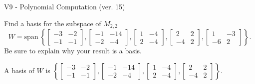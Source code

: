 \begin{exercise}
  \begin{exerciseTitle}V9 - Polynomial Computation (ver. 15)\end{exerciseTitle}
  \begin{exerciseStatement}
    Find a basis for the subspace of \(M_{2,2}\) 
\[W=\mathrm{span}\ \left\{\left[\begin{array}{cc}
-3 & -2 \\
-1 & -1
\end{array}\right] , \left[\begin{array}{cc}
-1 & -14 \\
-2 & -4
\end{array}\right] , \left[\begin{array}{cc}
1 & -4 \\
2 & -4
\end{array}\right] , \left[\begin{array}{cc}
2 & 2 \\
-4 & 2
\end{array}\right] , \left[\begin{array}{cc}
1 & -3 \\
-6 & 2
\end{array}\right]\right\}.\]
 Be sure to explain why your result is a basis.


  \end{exerciseStatement}
  \begin{exerciseAnswer}
   A basis of \(W\) is  \(\left\{\left[\begin{array}{cc}
-3 & -2 \\
-1 & -1
\end{array}\right] , \left[\begin{array}{cc}
-1 & -14 \\
-2 & -4
\end{array}\right] , \left[\begin{array}{cc}
1 & -4 \\
2 & -4
\end{array}\right] , \left[\begin{array}{cc}
2 & 2 \\
-4 & 2
\end{array}\right]\right\}\).
  


  \end{exerciseAnswer}
\end{exercise}
